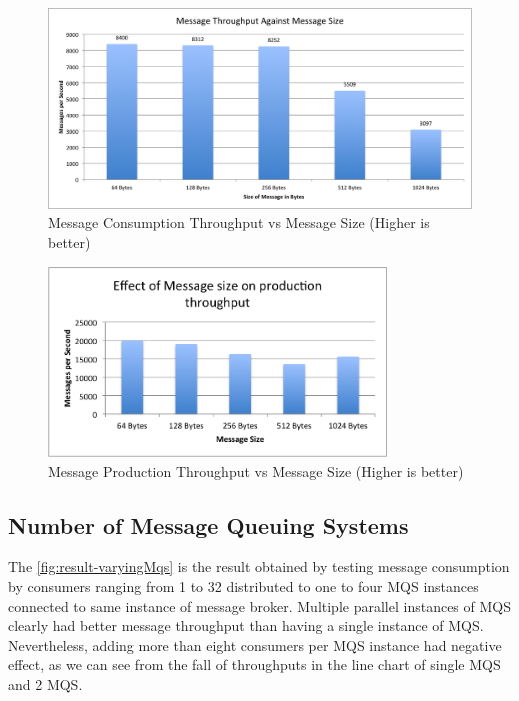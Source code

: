 \begin{figure}[H]
  \centering  \includegraphics[width=1\textwidth]{figures/02consumptionMessageSize}
  \caption[Message Consumption Throughput vs Message Size]{Message Consumption Throughput vs Message Size (Higher is better)}
  \label{fig:result-consumptionMessageSize}
\end{figure}

\begin{figure}[H]
  \centering  \includegraphics[width=0.8\textwidth]{figures/03productionMessageSize}
  \caption[Message Production Throughput vs Message Size]{Message Production Throughput vs Message Size (Higher is better)}
  \label{fig:result-productionMessageSize}
\end{figure}

\subsection{Number of Message Queuing Systems}
  The \autoref{fig:result-varyingMqs} is the result obtained by testing message consumption by consumers ranging from 1 to 32 distributed to one to four MQS instances connected to same instance of message broker. Multiple parallel instances of MQS clearly had better message throughput than having a single instance of MQS. Nevertheless, adding more than eight consumers per MQS instance had negative effect, as we can see from the fall of throughputs in the line chart of single MQS and 2 MQS.


